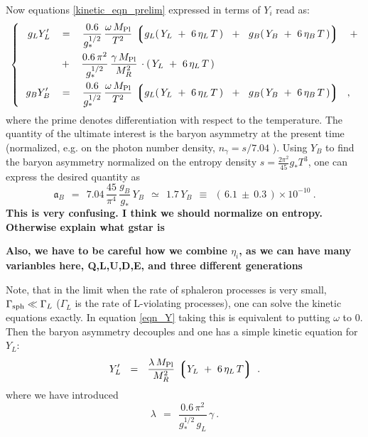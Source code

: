 \documentclass[12pt]{revtex4}
\newcommand{\lgr}{\left\lgroup}
\newcommand{\rgr}{\right\rgroup}
\newcommand{\Mpl}{M_{\rm Pl}}
\newcommand{\Gsph}{\Gamma_{\rm sph}}
\begin{document}
	Now equations \eqref{kinetic_eqn_prelim} expressed in terms of
	$ Y_i $ read as:
\begin{equation}
\label{eqn_Y}
\left\{~~
\begin{split}
	g_L Y_L' 
	& ~~\;=~~\;
	\frac{0.6}{g_*^{1/2}}\, 
	\frac{\omega\,\Mpl}{T^2}\,
	\lgr g_L (\,Y_L~+~6\,\eta_L\,T\,) ~~+~~ 
	     g_B (\,Y_B~+~6\,\eta_B\,T\,)  \rgr 
	\;~~+
	\\
	& \;~~+~~\;  
	\frac{0.6\,\pi^2}{g_*^{1/2}}\, 
	\frac{\gamma\,\Mpl}{M_R^2}\,
	\cdot (\, Y_L ~+~ 6\,\eta_L\,T\,)\\
	g_B Y_B' 
	& ~~\;=~~\;
	\frac{0.6}{g_*^{1/2}}\, 
	\frac{\omega\,\Mpl}{T^2}\,
	\lgr g_L (\,Y_L~+~6\,\eta_L\,T\,) ~~+~~ 
	     g_B (\,Y_B~+~6\,\eta_B\,T\,)  \rgr 
	~~,
\end{split}
\right.
\end{equation}
	where the prime denotes differentiation with respect to
	the temperature.
	The quantity of the ultimate interest is the baryon asymmetry 
	at the present time (normalized, e.g. on the photon number density,
	$ n_\gamma = s / 7.04 $ \cite{Kolb:1990vq}). 
	Using $ Y_B $ to find the baryon asymmetry normalized on the entropy
	density $ s = \frac{2\pi^2}{45} g_* T^3 $, one can express the desired
	quantity as
\begin{equation}
\label{def_asy}
	\mathfrak{a}_B ~~=~~ 7.04\, \frac{45}{\pi^4}\, \frac{g_B}{g_*}\, Y_B
	~~\simeq~~ 1.7 \, Y_B 
		~~\equiv~~ (\, 6.1 ~\pm~ 0.3 \,)\times 10^{-10}~.
\end{equation}
{\bf This is very confusing. I think we should normalize on entropy.
Otherwise explain what gstar is}

{\bf Also, we have to be careful how we combine $\eta_i$, as we can have many varianbles here, 
Q,L,U,D,E, and three different generations} 

	Note, that in the limit when the rate of sphaleron processes
	is very small, $ \Gsph \ll \Gamma_L $ ($ \Gamma_L $ is the rate
	of L-violating processes), one can solve the kinetic equations
	exactly. 
	In equation \eqref{eqn_Y} taking this is equivalent to 
	putting $ \omega $ to $ 0 $.
	Then the baryon asymmetry decouples and one has a simple 
	kinetic equation for $ Y_L $:
\begin{equation}
\label{btz_simple}
	Y_L' ~~=~~ \frac{\lambda\,\Mpl}{M_R^2} \,
			\lgr Y_L ~+~ 6\,\eta_L\, T \rgr~.
\end{equation}
	where we have introduced
\[
	\lambda ~~=~~ \frac{0.6\, \pi^2}
    		         {g_*^{1/2}\, g_L}\,\gamma~.
\]
	
\end{document}
